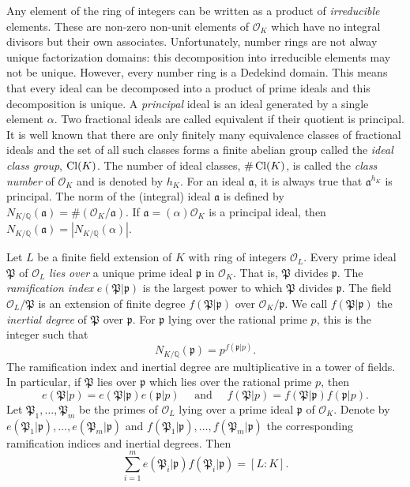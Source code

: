 Any element of the ring of integers can be written as a product of \textit{irreducible} elements. These are non-zero non-unit elements of $\mathcal{O}_K$ which have no integral divisors but their own associates. Unfortunately, number rings are not alway unique factorization domains: this decomposition into irreducible elements may not be unique. However, every number ring is a Dedekind domain. This means that every ideal can be decomposed into a product of prime ideals and this decomposition is unique. A \textit{principal} ideal is an ideal generated by a single element $\alpha$. Two fractional ideals are called equivalent if their quotient is principal. It is well known that there are only finitely many equivalence classes of fractional ideals and the set of all such classes forms a finite abelian group called the \textit{ideal class group}, $\operatorname{Cl}(K)$. The number of ideal classes, $\#\operatorname{Cl}(K)$, is called the \textit{class number} of $\mathcal{O}_K$ and is denoted by $h_K$. For an ideal $\mathfrak{a}$, it is always true that $\mathfrak{a}^{h_K}$ is principal. The norm of the (integral) ideal $\mathfrak{a}$ is defined by $N_{K/\mathbb{Q}}(\mathfrak{a}) = \#\left(\mathcal{O}_K/\mathfrak{a}\right)$. If $\mathfrak{a} = (\alpha) \mathcal{O}_K$ is a principal ideal, then $N_{K/\mathbb{Q}}(\mathfrak{a}) = \left|N_{K/\mathbb{Q}}(\alpha)\right|$. 

Let $L$ be a finite field extension of $K$ with ring of integers $\mathcal{O}_L$. Every prime ideal $\mathfrak{P}$ of $\mathcal{O}_L$ \textit{lies over} a unique prime ideal $\mathfrak{p}$ in $\mathcal{O}_K$. That is, $\mathfrak{P}$ divides $\mathfrak{p}$. The \textit{ramification index} $e({\mathfrak{P}}|\mathfrak{p})$ is the largest power to which $\mathfrak{P}$ divides $\mathfrak{p}$. The field $\mathcal{O}_L/\mathfrak{P}$ is an extension of finite degree $f(\mathfrak{P}|\mathfrak{p})$ over $\mathcal{O}_K/\mathfrak{p}$. We call $f(\mathfrak{P}|\mathfrak{p})$ the \textit{inertial degree} of $\mathfrak{P}$ over $\mathfrak{p}$. For $\mathfrak{p}$ lying over the rational prime $p$, this is the integer such that 
\[N_{K/\mathbb{Q}}(\mathfrak{p}) = p^{f(\mathfrak{p}|p)}.\]
The ramification index and inertial degree are multiplicative in a tower of fields. In particular, if $\mathfrak{P}$ lies over $\mathfrak{p}$ which lies over the rational prime $p$, then
\[e({\mathfrak{P}}|p) = e({\mathfrak{P}}|\mathfrak{p})e({\mathfrak{p}}|p) \quad \text{ and } \quad f({\mathfrak{P}}|p) = f({\mathfrak{P}}|\mathfrak{p})f({\mathfrak{p}}|p).\]
Let $\mathfrak{P}_1, \dots, \mathfrak{P}_m$ be the primes of $\mathcal{O}_L$ lying over a prime ideal $\mathfrak{p}$ of $\mathcal{O}_K$. Denote by $e({\mathfrak{P}}_1|\mathfrak{p}),\dots, e({\mathfrak{P}}_m|\mathfrak{p})$ and $f({\mathfrak{P}}_1|\mathfrak{p}), \dots, f({\mathfrak{P}}_m|\mathfrak{p})$ the corresponding ramification indices and inertial degrees. Then
\[\sum_{i=1}^m e({\mathfrak{P}}_i|\mathfrak{p})f({\mathfrak{P}}_i|\mathfrak{p}) = [L:K].\]

